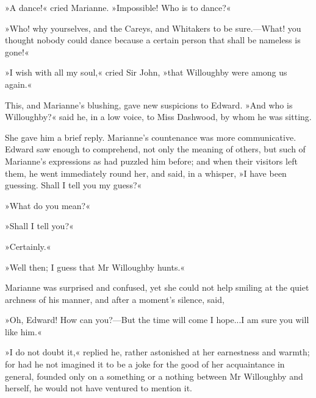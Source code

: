 »A dance!« cried Marianne. »Impossible! Who is to dance?«

»Who! why yourselves, and the Careys, and Whitakers to be sure.—What! you thought nobody could dance because a certain person that shall be nameless is gone!«

»I wish with all my soul,« cried Sir John, »that Willoughby were among us again.«

This, and Marianne’s blushing, gave new suspicions to Edward. »And who is Willoughby?« said he, in a low voice, to Miss Dashwood, by whom he was sitting.

She gave him a brief reply. Marianne’s countenance was more communicative. Edward saw enough to comprehend, not only the meaning of others, but such of Marianne’s expressions as had puzzled him before; and when their visitors left them, he went immediately round her, and said, in a whisper, »I have been guessing. Shall I tell you my guess?«

»What do you mean?«

»Shall I tell you?«

»Certainly.«

»Well then; I guess that Mr Willoughby hunts.«

Marianne was surprised and confused, yet she could not help smiling at the quiet archness of his manner, and after a moment’s silence, said,

»Oh, Edward! How can you?—But the time will come I hope...I am sure you will like him.«

»I do not doubt it,« replied he, rather astonished at her earnestness and warmth; for had he not imagined it to be a joke for the good of her acquaintance in general, founded only on a something or a nothing between Mr Willoughby and herself, he would not have ventured to mention it.